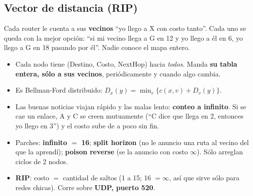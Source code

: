\documentclass[10pt,a4paper]{article}
\newcommand{\term}[1]{\textbf{\color{azul}#1}}
\begin{document}
\subsection{Vector de distancia (RIP)}
\begin{idea}
Cada router le cuenta a sus \textbf{vecinos} ``yo llego a X con costo tanto''. Cada uno se queda con la mejor opción:
``si mi vecino llega a G en 12 y yo llego a él en 6, yo llego a G en 18 pasando por él''. Nadie conoce el mapa entero.
\end{idea}
\begin{itemize}
  \item Cada nodo tiene (Destino, Costo, NextHop) hacia \emph{todos}. Manda \textbf{su tabla entera, sólo a sus vecinos}, periódicamente y cuando algo cambia.
  \item Es Bellman-Ford distribuido: $D_x(y) = \min_v \{ c(x,v) + D_v(y) \}$.
  \item Las buenas noticias viajan rápido y las malas lento: \term{conteo a infinito}. Si se cae un enlace, A y C se creen mutuamente (``C dice que llega en 2, entonces yo llego en 3'') y el costo sube de a poco sin fin.
  \item Parches: \textbf{infinito $=$ 16}; \term{split horizon} (no le anuncio una ruta al vecino del que la aprendí); \term{poison reverse} (se la anuncio con costo $\infty$). Sólo arreglan ciclos de 2 nodos.
  \item \term{RIP}: costo $=$ cantidad de saltos (1 a 15; 16 $=\infty$, así que sirve sólo para redes chicas). Corre sobre \textbf{UDP, puerto 520}.
\end{itemize}
\end{document}
